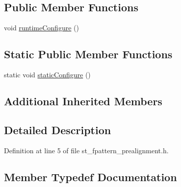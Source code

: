 \subsection*{Public Member Functions}
\begin{DoxyCompactItemize}
\item 
void \hyperlink{structsm__dance__bot__strikes__back_1_1StFpatternPrealignment_a12d2806c617371082410914de7444238}{runtime\+Configure} ()
\end{DoxyCompactItemize}
\subsection*{Static Public Member Functions}
\begin{DoxyCompactItemize}
\item 
static void \hyperlink{structsm__dance__bot__strikes__back_1_1StFpatternPrealignment_a174f61be56796e4124aad1f97a49cb26}{static\+Configure} ()
\end{DoxyCompactItemize}
\subsection*{Additional Inherited Members}


\subsection{Detailed Description}


Definition at line 5 of file st\+\_\+fpattern\+\_\+prealignment.\+h.



\subsection{Member Typedef Documentation}
\mbox{\label{structsm__dance__bot__strikes__back_1_1StFpatternPrealignment_a0c187659c7f748fbf526e692e9e86430}} 
